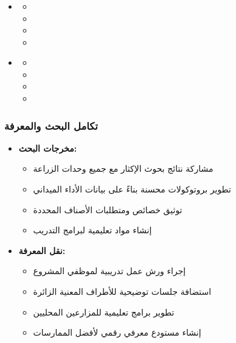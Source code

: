 \subsubsection{} \label{sec:nursery_palm_integration}
\begin{itemize}
    \item \textbf{}
    \begin{itemize}
        \item {}
        \item {}
        \item {}
        \item {}
    \end{itemize}
    
    \item \textbf{}
    \begin{itemize}
        \item {}
        \item {}
        \item {}
        \item {}
    \end{itemize}
\end{itemize}

\subsubsection{تكامل البحث والمعرفة}
\begin{itemize}
    \item \textbf{مخرجات البحث:}
    \begin{itemize}
        \item مشاركة نتائج بحوث الإكثار مع جميع وحدات الزراعة
        \item تطوير بروتوكولات محسنة بناءً على بيانات الأداء الميداني
        \item توثيق خصائص ومتطلبات الأصناف المحددة
        \item إنشاء مواد تعليمية لبرامج التدريب
    \end{itemize}
    
    \item \textbf{نقل المعرفة:}
    \begin{itemize}
        \item إجراء ورش عمل تدريبية لموظفي المشروع
        \item استضافة جلسات توضيحية للأطراف المعنية الزائرة
        \item تطوير برامج تعليمية للمزارعين المحليين
        \item إنشاء مستودع معرفي رقمي لأفضل الممارسات
    \end{itemize}
\end{itemize}


